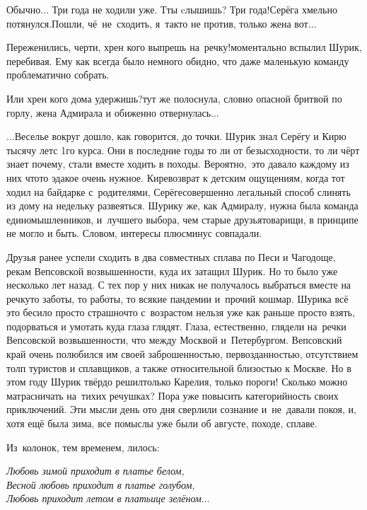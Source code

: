 {\diagdash Обычно$\ldots$ Три года не ходили уже. Т\sdash ты cлышишь? Три года!\mdash Серёга хмельно потянулся.\mdash Пошли, чё~не~сходить, я~так\sdash то не против, только жена вот$\ldots$

\diagdash Переженились, черти, хрен кого выпрешь на~речку!\mdash моментально вспылил Шурик, перебивая. Ему как всегда было немного обидно, что даже маленькую команду проблематично собрать.

\diagdash Или хрен кого дома удержишь?\mdash тут же полоснула, словно опасной бритвой по горлу, жена Адмирала и обиженно отвернулась$\ldots$ 

$\ldots$Веселье вокруг дошло, как говорится, до точки. Шурик знал Серёгу и Кирю тысячу лет\mdash с 1\sdash го курса. Они в последние годы то ли от безысходности, то ли чёрт знает почему, стали вместе ходить в походы. Вероятно,~это давало каждому из них что\sdash то эдакое очень нужное. Кире\mdash возврат к детским ощущениям, когда тот ходил на байдарке с~родителями, Серёге\mdash совершенно легальный способ слинять из дому на недельку развеяться. Шурику же, как Адмиралу, нужна была команда единомышленников, и~лучшего выбора, чем старые друзья\sdash товарищи, в принципе не могло и быть. Словом, интересы плюс\sdash минус совпадали. 

Друзья ранее успели сходить в два совместных сплава по Песи и Чагодоще, рекам Вепсовской возвышенности, куда их затащил Шурик. Но то было уже несколько лет назад. С тех пор у них никак не получалось выбраться вместе на речку\mdash то заботы, то работы, то всякие пандемии и~прочий кошмар. Шурика всё это бесило просто страшно\mdash что с~возрастом нельзя уже как раньше просто взять, подорваться и умотать куда глаза глядят. Глаза, естественно, глядели на~речки Вепсовской возвышенности, что между Москвой и~Петербургом. Вепсовский край очень полюбился им своей заброшенностью, первозданностью, отсутствием толп туристов и сплавщиков, а также относительной близостью к Москве. Но в этом году Шурик твёрдо решил\mdash только Карелия, только пороги! Сколько можно матрасничать на~тихих речушках? Пора уже повысить категорийность своих приключений. Эти мысли день ото дня сверлили сознание и~не~давали покоя, и, хотя ещё была зима, все помыслы уже были об августе, походе, сплаве.

\newpage
Из~колонок, тем временем, лилось:

\vspace{0.01cm}
\noindent\textit{%
	\hspace*{1.4cm}Любовь зимой приходит в платье белом,\\
	\hspace*{1.4cm}Весной любовь приходит в платье голубом,\\
	\hspace*{1.4cm}Любовь приходит летом в платьице зелёном$\ldots$
}
\vspace{0.01cm}

}
